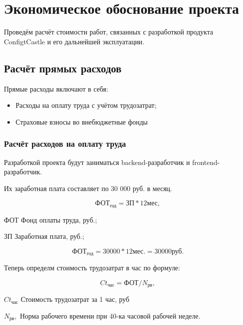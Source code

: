 \section{Экономическое обоснование проекта}

Проведём расчёт стоимости работ, связанных с разработкой
продукта ConfigtCastle и его дальнейшей эксплуатации.

\subsection{Расчёт прямых расходов}

Прямые расходы включают в себя:
\begin{itemize}
    \item Расходы на оплату труда с учётом трудозатрат;
    \item Страховые взносы во внебюджетные фонды
\end{itemize}

\subsubsection{Расчёт расходов на оплату труда}

Разработкой проекта будут заниматься backend-разработчик и
frontend-разработчик.

Их заработная плата составляет по 30 000 руб. в месяц.

\begin{equation}
   \text{ФОТ}_\text{год} = \text{ЗП} * 12 \text{мес},
\end{equation}

\begin{eqexpl}[25mm]
    \item{ФОТ} Фонд оплаты труда, руб.;
    \item{ЗП} Заработная плата, руб.;
\end{eqexpl}

\begin{equation*}
    \text{ФОТ}_\text{год} = 30 000 * 12 \text{мес.} = 30 000 \text{руб.}
\end{equation*}

Теперь определм стоимость трудозатрат в час по формуле:

\begin{equation}
    Ct_\text{час} = \text{ФОТ} / N_\text{рв},
\end{equation}

\begin{eqexpl}[25mm]
    \item{$Ct_\text{час}$} Стоимость трудозатрат за 1 час, руб
    \item{$N_\text{рв},$} Норма рабочего времени при 40-ка часовой рабочей
неделе.
\end{eqexpl}

